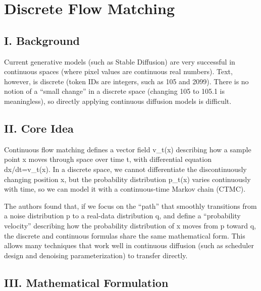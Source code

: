 \setcounter{section}{1}

\hypertarget{discrete-flow-matching}{%
\section{Discrete Flow Matching}\label{discrete-flow-matching}}

\hypertarget{i.-background-7}{%
\subsection{I. Background}\label{i.-background-7}}

Current generative models (such as Stable Diffusion) are very successful in continuous spaces (where pixel values are continuous real numbers). Text, however, is discrete (token IDs are integers, such as 105 and 2099). There is no notion of a ``small change'' in a discrete space (changing 105 to 105.1 is meaningless), so directly applying continuous diffusion models is difficult.

\hypertarget{ii.-core-idea}{%
\subsection{II. Core Idea}\label{ii.-core-idea}}

Continuous flow matching defines a vector field v\_t(x) describing how a sample point x moves through space over time t, with differential equation dx/dt=v\_t(x). In a discrete space, we cannot differentiate the discontinuously changing position x, but the probability distribution p\_t(x) varies continuously with time, so we can model it with a continuous-time Markov chain (CTMC).

The authors found that, if we focus on the ``path'' that smoothly transitions from a noise distribution p to a real-data distribution q, and define a ``probability velocity'' describing how the probability distribution of x moves from p toward q, the discrete and continuous formulas share the same mathematical form. This allows many techniques that work well in continuous diffusion (such as scheduler design and denoising parameterization) to transfer directly.

\hypertarget{iii.-mathematical-formulation}{%
\subsection{III. Mathematical Formulation}\label{iii.-mathematical-formulation}}

